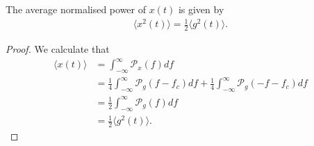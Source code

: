 \documentclass{memoir}
\begin{document}
\begin{theorem}
    The average normalised power of $x(t)$ is given by
    \begin{align*}
        \langle x^2(t)\rangle = \frac{1}{2} \langle g^2(t) \rangle.
    \end{align*}
\end{theorem}
\begin{proof}
    We calculate that
    \begin{align*}
        \langle x(t) \rangle &= \int_{-\infty}^{\infty} \mathcal{P}_x(f) df \\
        &= \frac{1}{4} \int_{-\infty}^{\infty} \mathcal{P}_g(f-f_c) df + \frac{1}{4} \int_{-\infty}^{\infty} \mathcal{P}_g(-f-f_c) df \\
        &= \frac{1}{2} \int_{-\infty}^{\infty} \mathcal{P}_g(f) df \\
        &= \frac{1}{2} \langle g^2(t) \rangle.
    \end{align*}
\end{proof}
\end{document}
